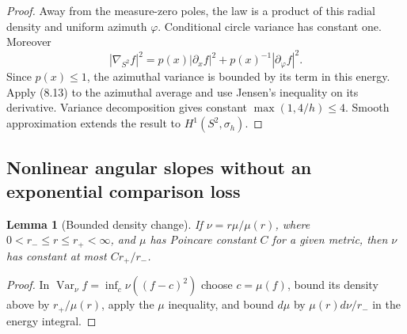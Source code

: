 \documentclass[11pt,oneside]{article}
\newtheorem{lemma}[theorem]{Lemma}
\DeclareMathOperator{\Var}{Var}
\begin{document}
\begin{proof}
Away from the measure-zero
poles, the law is a product
of this radial density and
uniform azimuth \(\varphi\).
Conditional circle variance
has constant one. Moreover
\[
 |\nabla_{S^2}f|^2
           =p(x)|\partial_xf|^2
                    +p(x)^{-1}|\partial_\varphi f|^2.
 \tag{8.14}
\]
Since \(p(x)\le1\), the
azimuthal variance is bounded
by its term in this energy.
Apply (8.13) to the azimuthal
average and use Jensen's
inequality on its derivative.
Variance decomposition gives
constant \(\max(1,4/h)\le4\).
Smooth approximation extends
the result to \(H^1(S^2,\sigma_h)\).
\end{proof}

\subsection{Nonlinear angular slopes without an exponential comparison loss}

\begin{lemma}[Bounded density change]
\label{lem:f13v3-density}
If \(\nu=r\mu/\mu(r)\), where
\(0<r_-\le r\le r_+<\infty\),
and \(\mu\) has Poincare
constant \(C\) for a given
metric, then \(\nu\) has
constant at most \(Cr_+/r_-\).
\end{lemma}
\begin{proof}
In \(\Var_\nu f=\inf_c\nu((f-c)^2)\)
choose \(c=\mu(f)\), bound its
density above by \(r_+/\mu(r)\),
apply the \(\mu\) inequality,
and bound \(d\mu\) by
\(\mu(r)d\nu/r_-\) in the
energy integral.
\end{proof}
\end{document}
